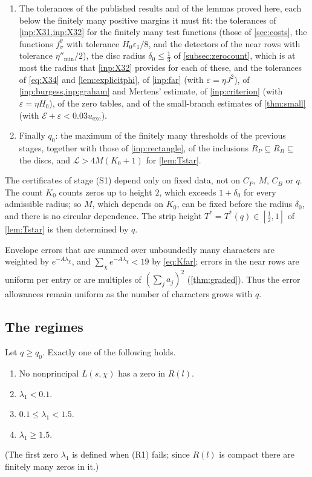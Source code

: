 \documentclass[11pt]{amsart}
\numberwithin{equation}{section}
\theoremstyle{plain}
\theoremstyle{definition}
\theoremstyle{remark}
\newcommand{\LL}{\mathcal{L}}
\newcommand{\eps}{\varepsilon}
\newcommand{\1}{\mathbf{1}}
\begin{document}
\begin{enumerate}[(S1)]
    (\cref{lem:decaytransform}). Then the buffer $C_B>\max(C_P+M,\,1.5)$ with
    $4c_{\mathrm{out}}/(H_0C_B^2)\le\eta$.
  \item The tolerances of the published results and of the lemmas proved here, each below the
    finitely many positive margins it must fit: the tolerances of \cref{inp:X31,inp:X32} for the
    finitely many test functions (those of \cref{sec:costs}, the functions $f^\theta_\sigma$ with tolerance
    $H_0\eps_1/8$, and the detectors of the near rows with tolerance $\eta''_{\min}/2$), the disc radius $\delta_0\le\frac13$ of \cref{subsec:zerocount},
    which is at most the radius that \cref{inp:X32} provides for each of these, and the tolerances
    of \eqref{eq:X34} and \cref{lem:explicitphi}, of
    \cref{inp:far} (with $\eps=\eta J^2$), of \cref{inp:burgess,inp:graham} and Mertens' estimate, of
    \cref{inp:criterion} (with $\eps=\eta H_0$), of the zero tables, and of the small-branch
    estimates of \cref{thm:small} (with $\mathcal E+\eps<0.03u_{\mathrm{exc}}$).
  \item Finally $q_0$: the maximum of the finitely many thresholds of the previous stages, together
    with those of \cref{inp:rectangle}, of the inclusions $R_P\subseteq R_B\subseteq$ the discs, and
    $\LL>4M(K_0+1)$ for \cref{lem:Tstar}.
\end{enumerate}
The certificates of stage (S1) depend only on fixed data, not on $C_P$, $M$, $C_B$ or $q$. The
count $K_0$ counts zeros up to height $2$, which exceeds $1+\delta_0$ for every admissible radius;
so $M$, which depends on $K_0$, can be fixed before the radius $\delta_0$, and there is no circular
dependence. The strip height $T^*=T^*(q)\in[\frac12,1]$ of \cref{lem:Tstar} is then determined by $q$.

Envelope errors that are summed over unboundedly many characters are weighted by
$e^{-A\lambda_\chi}$, and $\sum_\chi e^{-A\lambda_\chi}<19$ by \eqref{eq:Kfar}; errors in the near rows are
uniform per entry or are multiples of $(\sum_ja_j)^2$ (\cref{thm:graded}). Thus the error
allowances remain uniform as the number of characters grows with $q$.

\subsection{The regimes}
Let $q\ge q_0$. Exactly one of the following holds.
\begin{enumerate}[(R1)]
  \item No nonprincipal $L(s,\chi)$ has a zero in $R(l)$.
  \item $\lambda_1<0.1$.
  \item $0.1\le\lambda_1<1.5$.
  \item $\lambda_1\ge1.5$.
\end{enumerate}
(The first zero $\lambda_1$ is defined when (R1) fails; since $R(l)$ is compact there are finitely
many zeros in it.)
\end{document}
